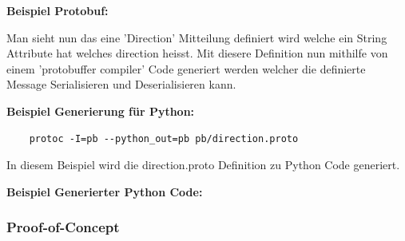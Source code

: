 \documentclass[../../main.tex]{subfiles}
\begin{document}
\textbf{Beispiel Protobuf:}

Man sieht nun das eine 'Direction' Mitteilung definiert wird welche ein String Attribute hat welches direction heisst. Mit diesere Definition
nun mithilfe von einem 'protobuffer compiler' Code generiert werden welcher die definierte Message Serialisieren und Deserialisieren kann.

\textbf{Beispiel Generierung für Python:}
\begin{lstlisting}
    protoc -I=pb --python_out=pb pb/direction.proto
\end{lstlisting}
In diesem Beispiel wird die direction.proto Definition zu Python Code generiert.

\textbf{Beispiel Generierter Python Code:}


\subsubsection{Proof-of-Concept}
\end{document}
